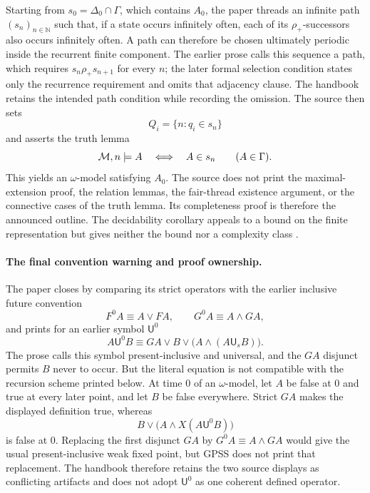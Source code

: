 Starting from \(s_0=\Delta_0\cap\Gamma\), which contains \(A_0\), the paper
threads an
infinite path \((s_n)_{n\in\mathbb N}\) such that, if a state occurs infinitely
often, each of its \(\rho_+\)-successors also occurs infinitely often.  A path
can therefore be chosen ultimately periodic inside the recurrent finite
component.  The earlier prose calls this sequence a path, which requires
\(s_n\mathrel{\rho_+}s_{n+1}\) for every \(n\); the later formal selection
condition states only the recurrence requirement and omits that adjacency
clause.  The handbook retains the intended path condition while recording the
omission.  The source then sets
\[
 Q_i=\{n:q_i\in s_n\}
\]
and asserts the truth lemma
\[
 \mathcal M,n\models A
 \quad\Longleftrightarrow\quad
 A\in s_n
 \qquad(A\in\Gamma).
\]
This yields an \(\omega\)-model satisfying \(A_0\).  The source does not print
the maximal-extension proof, the relation lemmas, the fair-thread existence
argument, or the connective cases of the truth lemma.  Its completeness proof
is therefore the announced outline.  The decidability corollary appeals to a
bound on the finite representation but gives neither the bound nor a
complexity class \cite[pp.~171--172]{GabbayPnueliShelahStavi1980}.

\paragraph{The final convention warning and proof ownership.}
The paper closes by comparing its strict operators with the earlier inclusive
future convention
\[
 F^0A\equiv A\lor FA,
 \qquad
 G^0A\equiv A\land GA,
\]
and prints for an earlier symbol \(\mathsf U^0\)
\[
 A\mathbin{\mathsf U^0}B
 \equiv
 GA\lor B\lor\bigl(A\land(A\mathbin{\mathsf U_s}B)\bigr).
\]
The prose calls this symbol present-inclusive and universal, and the \(GA\)
disjunct permits \(B\) never to occur.  But the literal equation is not
compatible with the recursion scheme printed below.  At time \(0\) of an
\(\omega\)-model, let \(A\) be false at \(0\) and true at every later point,
and let \(B\) be false everywhere.  Strict \(GA\) makes the displayed
definition true, whereas
\[
 B\lor\bigl(A\land X(A\mathbin{\mathsf U^0}B)\bigr)
\]
is false at \(0\).  Replacing the first disjunct \(GA\) by
\(G^0A\equiv A\land GA\) would give the usual present-inclusive weak fixed
point, but GPSS does not print that replacement.  The handbook therefore
retains the two source displays as conflicting artifacts and does not adopt
\(\mathsf U^0\) as one coherent defined operator.

